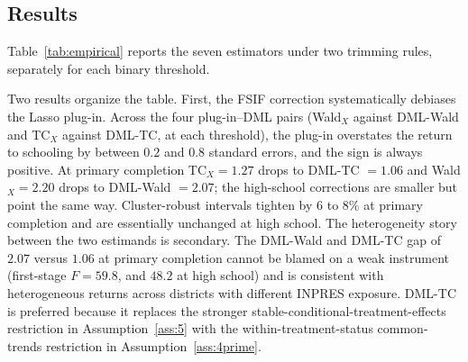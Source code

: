 \subsection{Results}

Table~\ref{tab:empirical} reports the seven estimators under two trimming rules, separately for each binary threshold.

\begin{table}[h!]
    \centering
    \resizebox{\textwidth}{!}{}
    \caption[Returns to schooling from INPRES school construction]{Returns to schooling from INPRES school construction. Sample: both sexes with non-missing log hourly wage, cohorts 1957--1962 and 1968--1972, $G^* \in \{0, 1\}$, $N = 22{,}414$ ($201$ districts). Panel A uses $D = \mathbf{1}\{\text{yeduc} \geq 6\}$ (primary completion); Panel B uses $D = \mathbf{1}\{\text{yeduc} \geq 12\}$ (high-school completion). Outcome $Y$ is log hourly wage. Dictionary of $p = 45$ regressors from sex, birth-year dummies, Java, urban, and pairwise interactions (Appendix~\ref{sec:6c}). DML estimators use Lasso with $L = 5$-fold observation-level cross-fitting and the FSIF correction of Proposition~\ref{prop:2}. Superscript $s$ denotes symmetric trimming $\hat e(X) \in [0.10, 0.90]$ (Crump et al.\ 2009); superscript $\hat\alpha$ denotes the paper's one-sided data-driven rule of Conjecture~\ref{cor:onesided}, which returns $\hat\alpha = 0$ on this dictionary. Standard errors clustered at the district of birth. Bold marks the preferred estimate in each panel. Per-year CI rescales the per-complier interval by the threshold in years. Four-learner robustness in Appendix~\ref{sec:app_empirical}.}\label{tab:empirical}
\end{table}

\FloatBarrier
Two results organize the table. First, the FSIF correction systematically debiases the Lasso plug-in. Across the four plug-in–DML pairs (Wald$_X$ against DML-Wald and TC$_X$ against DML-TC, at each threshold), the plug-in overstates the return to schooling by between $0.2$ and $0.8$ standard errors, and the sign is always positive. At primary completion TC$_X = 1.27$ drops to DML-TC $= 1.06$ and Wald$_X = 2.20$ drops to DML-Wald $= 2.07$; the high-school corrections are smaller but point the same way. Cluster-robust intervals tighten by $6$ to $8\%$ at primary completion and are essentially unchanged at high school. The heterogeneity story between the two estimands is secondary. The DML-Wald and DML-TC gap of $2.07$ versus $1.06$ at primary completion cannot be blamed on a weak instrument (first-stage $F = 59.8$, and $48.2$ at high school) and is consistent with heterogeneous returns across districts with different INPRES exposure. DML-TC is preferred because it replaces the stronger stable-conditional-treatment-effects restriction in Assumption~\ref{ass:5} with the within-treatment-status common-trends restriction in Assumption~\ref{ass:4prime}.

